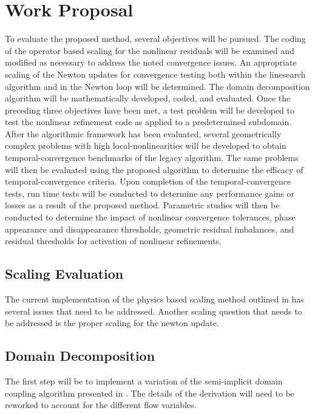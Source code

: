 \chapter{Work Proposal}
\label{chap:proposal}
To evaluate the proposed method, several objectives will be pursued.
The coding of the operator based scaling for the nonlinear residuals will be examined and modified as necessary to address the noted convergence issues.
An appropriate scaling of the Newton updates for convergence testing both within the linesearch algorithm and in the Newton loop will be determined.
The domain decomposition algorithm will be mathematically developed, coded, and evaluated.
Once the preceding three objectives have been met, a test problem will be developed to test the nonlinear refinement code as applied to a predetermined subdomain.
After the algorithmic framework has been evaluated, several geometrically complex problems with high local-nonlinearities will be developed to obtain temporal-convergence benchmarks of the legacy algorithm.
The same problems will then be evaluated using the proposed algorithm to determine the efficacy of temporal-convergence criteria.
Upon completion of the temporal-convergence tests, run time tests will be conducted to determine any performance gains or losses as a result of the proposed method.
Parametric studies will then be conducted to determine the impact of nonlinear convergence tolerances, phase appearance and disappearance thresholds, geometric residual imbalances, and residual thresholds for activation of nonlinear refinements.

\section{Scaling Evaluation}
\label{sect:proposal_scaling}
The current implementation of the physics based scaling method outlined in  has several issues that need to be addressed.
Another scaling question that needs to be addressed is the proper scaling for the newton update.

\section{Domain Decomposition}
\label{sect:domain_coupling}
The first step will be to implement a variation of the semi-implicit domain coupling algorithm presented in .
The details of the derivation will need to be reworked to account for the different flow variables.

